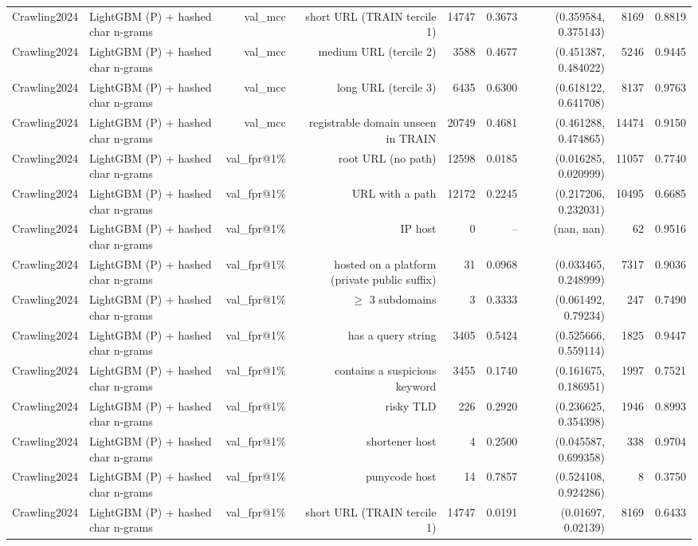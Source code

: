 \begin{table}[t]
\begin{tabular}{llrrrrrrr}
Crawling2024 & LightGBM (P) + hashed char n-grams & val\_mcc & short URL (TRAIN tercile 1) & 14747 & 0.3673 & (0.359584, 0.375143) & 8169 & 0.8819 \\
Crawling2024 & LightGBM (P) + hashed char n-grams & val\_mcc & medium URL (tercile 2) & 3588 & 0.4677 & (0.451387, 0.484022) & 5246 & 0.9445 \\
Crawling2024 & LightGBM (P) + hashed char n-grams & val\_mcc & long URL (tercile 3) & 6435 & 0.6300 & (0.618122, 0.641708) & 8137 & 0.9763 \\
Crawling2024 & LightGBM (P) + hashed char n-grams & val\_mcc & registrable domain unseen in TRAIN & 20749 & 0.4681 & (0.461288, 0.474865) & 14474 & 0.9150 \\
Crawling2024 & LightGBM (P) + hashed char n-grams & val\_fpr@1\% & root URL (no path) & 12598 & 0.0185 & (0.016285, 0.020999) & 11057 & 0.7740 \\
Crawling2024 & LightGBM (P) + hashed char n-grams & val\_fpr@1\% & URL with a path & 12172 & 0.2245 & (0.217206, 0.232031) & 10495 & 0.6685 \\
Crawling2024 & LightGBM (P) + hashed char n-grams & val\_fpr@1\% & IP host & 0 & -- & (nan, nan) & 62 & 0.9516 \\
Crawling2024 & LightGBM (P) + hashed char n-grams & val\_fpr@1\% & hosted on a platform (private public suffix) & 31 & 0.0968 & (0.033465, 0.248999) & 7317 & 0.9036 \\
Crawling2024 & LightGBM (P) + hashed char n-grams & val\_fpr@1\% & $\geq$ 3 subdomains & 3 & 0.3333 & (0.061492, 0.79234) & 247 & 0.7490 \\
Crawling2024 & LightGBM (P) + hashed char n-grams & val\_fpr@1\% & has a query string & 3405 & 0.5424 & (0.525666, 0.559114) & 1825 & 0.9447 \\
Crawling2024 & LightGBM (P) + hashed char n-grams & val\_fpr@1\% & contains a suspicious keyword & 3455 & 0.1740 & (0.161675, 0.186951) & 1997 & 0.7521 \\
Crawling2024 & LightGBM (P) + hashed char n-grams & val\_fpr@1\% & risky TLD & 226 & 0.2920 & (0.236625, 0.354398) & 1946 & 0.8993 \\
Crawling2024 & LightGBM (P) + hashed char n-grams & val\_fpr@1\% & shortener host & 4 & 0.2500 & (0.045587, 0.699358) & 338 & 0.9704 \\
Crawling2024 & LightGBM (P) + hashed char n-grams & val\_fpr@1\% & punycode host & 14 & 0.7857 & (0.524108, 0.924286) & 8 & 0.3750 \\
Crawling2024 & LightGBM (P) + hashed char n-grams & val\_fpr@1\% & short URL (TRAIN tercile 1) & 14747 & 0.0191 & (0.01697, 0.02139) & 8169 & 0.6433 \\

\end{tabular}
\end{table}
